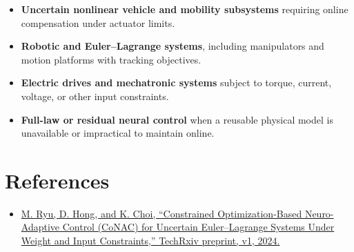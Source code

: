 \documentclass[a4paper]{article}
\begin{document}
\begin{itemize}
  \item \textbf{Uncertain nonlinear vehicle and mobility subsystems} requiring
  online compensation under actuator limits.
  \item \textbf{Robotic and Euler--Lagrange systems}, including manipulators and
  motion platforms with tracking objectives.
  \item \textbf{Electric drives and mechatronic systems} subject to torque,
  current, voltage, or other input constraints.
  \item \textbf{Full-law or residual neural control} when a reusable physical
  model is unavailable or impractical to maintain online.
\end{itemize}

\section{References}

\begin{itemize}
  \item 
    \href{
      https://kaist-mic-lab.github.io/publications/2025-CONAC-Robot/
    }{
      M. Ryu, D. Hong, and K. Choi, ``Constrained Optimization-Based
  Neuro-Adaptive Control (CoNAC) for Uncertain Euler--Lagrange Systems Under
  Weight and Input Constraints,'' TechRxiv preprint, v1, 2024.
    }
\end{itemize}





\end{document}
